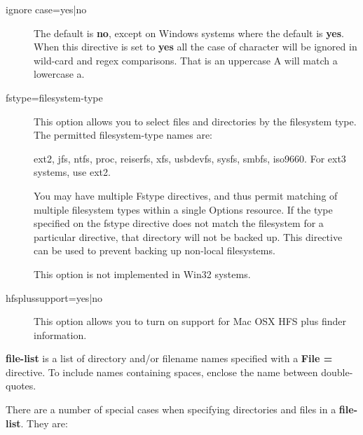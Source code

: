 \begin{description}
\item [ignore case=yes|no]
   The default is {\bf no}, except on Windows systems where the default
   is {\bf yes}. When this directive is set to {\bf yes} all the case
   of character will be ignored in wild-card and regex comparisons.
   That is an uppercase A will match a lowercase a.

\item [fstype=filesystem-type]
   This option allows you to select files and directories by the
   filesystem type.  The permitted filesystem-type names are:

   ext2, jfs, ntfs, proc, reiserfs, xfs, usbdevfs, sysfs, smbfs,
   iso9660.  For ext3 systems, use ext2.

   You may have multiple Fstype directives, and thus permit matching
   of multiple filesystem types within a single Options resource.  If
   the type specified on the fstype directive does not match the
   filesystem for a particular directive, that directory will not be
   backed up.  This directive can be used to prevent backing up
   non-local filesystems.

   This option is not implemented in Win32 systems.


\item [hfsplussupport=yes|no]
   This option allows you to turn on support for Mac OSX HFS plus 
   finder information.

\end{description}

{\bf \lt{}file-list\gt{}} is a list of directory and/or filename names
specified with a {\bf File =} directive. To include names containing spaces,
enclose the name between double-quotes. 

There are a number of special cases when specifying directories and files in a
{\bf file-list}. They are: 

